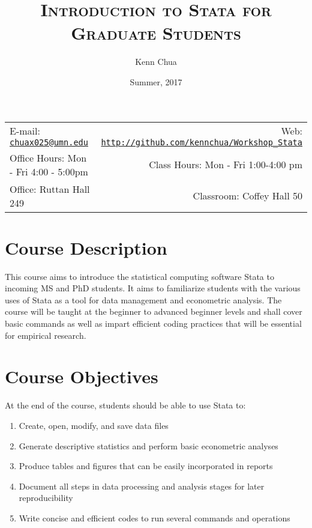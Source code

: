 \documentclass[11pt]{article}
\title{\textsc{Introduction to Stata for Graduate Students}}
\author{Kenn Chua}
\date{Summer, 2017}
\newcommand{\blankline}{\quad\pagebreak[2]}
\begin{document}
\maketitle

\blankline

\begin{tabular*}{.93\textwidth}{@{\extracolsep{\fill}}lr}
\hline 

E-mail:  \href{mailto:chuax025@umn.edu}{\nolinkurl{chuax025@umn.edu}} & Web: \href{http://github.com/kennchua/Workshop_Stata}{\nolinkurl{http://github.com/kennchua/Workshop_Stata}}  \\

 Office Hours: Mon - Fri 4:00 - 5:00pm  &  Class Hours: Mon - Fri 1:00-4:00 pm \\

 Office: Ruttan Hall 249 & Classroom: Coffey Hall 50 \\
\hline
\end{tabular*}

\vspace{5 mm}


\section*{Course Description}

This course aims to introduce the statistical computing software Stata to incoming MS and PhD students. It aims to familiarize students with the various uses of Stata as a tool for data management and econometric analysis. The course will be taught at the beginner to advanced beginner levels and shall cover basic commands as well as impart efficient coding practices that will be essential for empirical research.  



\section*{Course Objectives}
At the end of the course, students should be able to use Stata to:
\begin{enumerate}
\item Create, open, modify, and save data files
\item	 Generate descriptive statistics and perform basic econometric analyses
\item Produce tables and figures that can be easily incorporated in reports
\item Document all steps in data processing and analysis stages for later reproducibility     
\item Write concise and efficient codes to run several commands and operations  
\end{enumerate}
\end{document}
